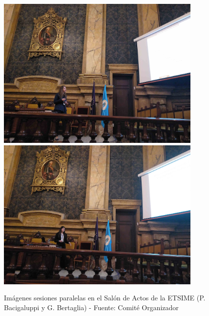 \documentclass[twoside]{article}
\begin{document}
\begin{center}
\begin{figure}
	\centering
		\includegraphics[width=0.9\textwidth]{PBacigaluppi}
		\includegraphics[width=0.9\textwidth]{GBertaglia}
	\label{fig:Salon4}
	\caption{Imágenes sesiones paralelas en el Salón de Actos de la ETSIME (P. Bacigaluppi y G. Bertaglia)  - Fuente: Comité Organizador}
\end{figure}
\end{center}
%
\end{document}
